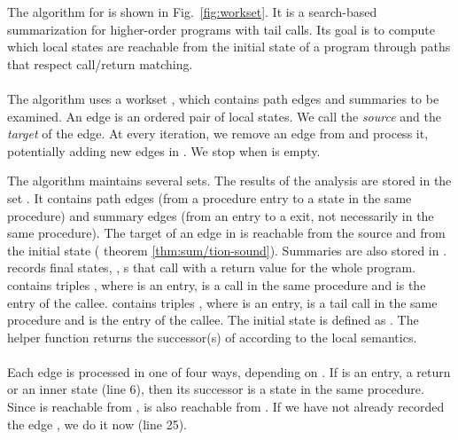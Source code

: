 \documentclass{LMCS}
\theoremstyle{definition} \newtheorem{property}[thm]{Property}
\begin{document}
The algorithm for \cfat{} is shown in Fig.~\ref{fig:workset}.
It is a search-based summarization for higher-order programs with tail calls.
Its goal is to compute which local states are reachable from the initial 
state of a program through paths that respect call/return matching.

\paragraph{}
The algorithm uses a workset \work, which contains path edges and summaries to
be examined.
An edge  is an ordered pair of local states.
We call \lstato{} the \emph{source} and \lstatw{} the \emph{target} of the edge.
At every iteration, we remove an edge from \work{} and process it, potentially 
adding new edges in \work.
We stop when \work{} is empty.

The algorithm maintains several sets.
The results of the analysis are stored in the set \seen.
It contains path edges (from a procedure entry to a state in the same procedure)
and summary edges (from an entry to a \dlceval{} exit, not necessarily in the
same procedure).
The target of an edge in \seen{} is reachable from the source and from the
initial state (\confer{} the\-o\-rem \ref{thm:sum/tion-sound}).
Summaries are also stored in \summary.
\finals{} records final states, \ie, \dlcapply s that call \haltcont{} with a 
return value for the whole program.
\callers{} contains triples \tuple{\lstato, \lstatw, \lstath}, where \lstato{}
is an entry, \lstatw{} is a call in the same procedure and \lstath{} is the
entry of the callee.
\tcallers{} contains triples \tuple{\lstato, \lstatw, \lstath}, where \lstato{}
is an entry, \lstatw{} is a tail call in the same pro\-ce\-dure and \lstath{} 
is the entry of the callee.
The initial state \linitstate{} is defined as \ctol{\initstate}.
The helper function \succ{\lstat} returns the successor(s) of \lstat{} according
to the local semantics.

\paragraph{}
Each edge  is processed in one of four ways, depending on 
\lstatw.
If \lstatw{} is an entry, a return or an inner state (line 6), 
then its successor \lstath{} is a state in the same procedure.
Since \lstatw{} is reachable from \lstato, 
\lstath{} is also reachable from \lstato.
If we have not already recorded the edge , we do it now 
(line 25).
\end{document}
